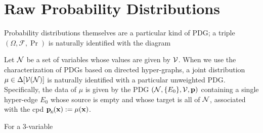 \documentclass[the-pdg-manual.tex]{subfiles}
\begin{document}
\section{Raw Probability Distributions}

Probability distributions themselves are a particular kind of PDG;
a  triple $(\Omega, \mathcal F, \Pr)$ is naturally identified with the diagram
\begin{center}
\end{center}


Let $\N$ be a set of variables whose values are given by $\V$. When we use the characterization of PDGs based on directed hyper-graphs, a joint distribution $\mu \in \Delta[\V(\N)]$ is naturally identified with a particular unweighted PDG. Specifically, the data of $\mu$ is given by the PDG $(\N, \{ E_0 \}, \V, \mat p)$ containing a single hyper-edge $E_0$ whose source is empty and whose target is all of $\N$, associated with the cpd $\bp[E](\mat x) := \mu(\mat x)$.

\begin{example}
	For a 3-variable
\end{example}
\end{document}
